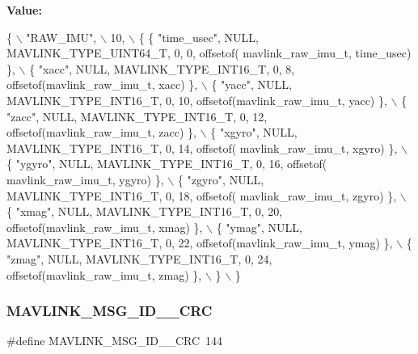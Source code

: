 {\bfseries Value\+:}
\begin{DoxyCode}
\{ \(\backslash\)
    \textcolor{stringliteral}{"RAW\_IMU"}, \(\backslash\)
    10, \(\backslash\)
    \{  \{ \textcolor{stringliteral}{"time\_usec"}, NULL, MAVLINK_TYPE_UINT64_T, 0, 0, offsetof(
      mavlink_raw_imu_t, time\_usec) \}, \(\backslash\)
         \{ \textcolor{stringliteral}{"xacc"}, NULL, MAVLINK_TYPE_INT16_T, 0, 8, offsetof(mavlink_raw_imu_t, xacc) \}, \(\backslash\)
         \{ \textcolor{stringliteral}{"yacc"}, NULL, MAVLINK_TYPE_INT16_T, 0, 10, offsetof(mavlink_raw_imu_t, yacc) \}, \(\backslash\)
         \{ \textcolor{stringliteral}{"zacc"}, NULL, MAVLINK_TYPE_INT16_T, 0, 12, offsetof(mavlink_raw_imu_t, zacc) \}, \(\backslash\)
         \{ \textcolor{stringliteral}{"xgyro"}, NULL, MAVLINK_TYPE_INT16_T, 0, 14, offsetof(
      mavlink_raw_imu_t, xgyro) \}, \(\backslash\)
         \{ \textcolor{stringliteral}{"ygyro"}, NULL, MAVLINK_TYPE_INT16_T, 0, 16, offsetof(
      mavlink_raw_imu_t, ygyro) \}, \(\backslash\)
         \{ \textcolor{stringliteral}{"zgyro"}, NULL, MAVLINK_TYPE_INT16_T, 0, 18, offsetof(
      mavlink_raw_imu_t, zgyro) \}, \(\backslash\)
         \{ \textcolor{stringliteral}{"xmag"}, NULL, MAVLINK_TYPE_INT16_T, 0, 20, offsetof(mavlink_raw_imu_t, xmag) \}, \(\backslash\)
         \{ \textcolor{stringliteral}{"ymag"}, NULL, MAVLINK_TYPE_INT16_T, 0, 22, offsetof(mavlink_raw_imu_t, ymag) \}, \(\backslash\)
         \{ \textcolor{stringliteral}{"zmag"}, NULL, MAVLINK_TYPE_INT16_T, 0, 24, offsetof(mavlink_raw_imu_t, zmag) \}, \(\backslash\)
         \} \(\backslash\)
\}
\end{DoxyCode}
\mbox{\label{mavlink__msg__raw__imu_8h_aa5ea68ba57f242c0647dc67576ba5f0d}} 
\subsubsection{M\+A\+V\+L\+I\+N\+K\+\_\+\+M\+S\+G\+\_\+\+I\+D\+\_\+\_\+\+C\+RC}
{\footnotesize\ttfamily \#define M\+A\+V\+L\+I\+N\+K\+\_\+\+M\+S\+G\+\_\+\+I\+D\+\_\+\_\+\+C\+RC~144}

\mbox{\label{mavlink__msg__raw__imu_8h_a81b34115208ff4727bb5933d7740c79d}} 
